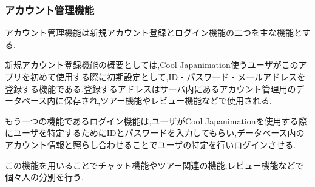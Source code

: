 \subsubsection{アカウント管理機能}
\par アカウント管理機能は新規アカウント登録とログイン機能の二つを主な機能とする.
\par 新規アカウント登録機能の概要としては,Cool Japanimation使うユーザがこのアプリを初めて使用する際に初期設定として,ID・パスワード・メールアドレスを登録する機能である.登録するアドレスはサーバ内にあるアカウント管理用のデータベース内に保存され,ツアー機能やレビュー機能などで使用される.
\par もう一つの機能であるログイン機能は,ユーザがCool Japanimationを使用する際にユーザを特定するためにIDとパスワードを入力してもらい,データベース内のアカウント情報と照らし合わせることでユーザの特定を行いログインさせる.
\par この機能を用いることでチャット機能やツアー関連の機能,レビュー機能などで個々人の分別を行う.
